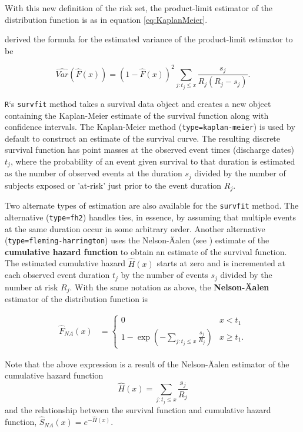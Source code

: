 \documentclass[]{book}
\theoremstyle{definition}
\theoremstyle{definition}
\theoremstyle{definition}
\theoremstyle{remark}
\begin{document}
With this new definition of the risk set, the product-limit estimator of
the distribution function is as in equation \eqref{eq:KaplanMeier}.

\citep{greenwood1926} derived the formula for the estimated variance of
the product-limit estimator to be

\[\widehat{Var}(\hat{F}(x)) = (1-\hat{F}(x))^{2} \sum _{j:t_{j} \leq x} \dfrac{s_j}{R_{j}(R_{j}-s_j)}.\]

\texttt{R}`s \texttt{survfit} method takes a survival data object and
creates a new object containing the Kaplan-Meier estimate of the
survival function along with confidence intervals. The Kaplan-Meier
method (\texttt{type=\textquotesingle{}kaplan-meier\textquotesingle{}})
is used by default to construct an estimate of the survival curve. The
resulting discrete survival function has point masses at the observed
event times (discharge dates) \(t_j\), where the probability of an event
given survival to that duration is estimated as the number of observed
events at the duration \(s_j\) divided by the number of subjects exposed
or 'at-risk' just prior to the event duration \(R_j\).

Two alternate types of estimation are also available for the
\texttt{survfit} method. The alternative
(\texttt{type=\textquotesingle{}fh2\textquotesingle{}}) handles ties, in
essence, by assuming that multiple events at the same duration occur in
some arbitrary order. Another alternative
(\texttt{type=\textquotesingle{}fleming-harrington\textquotesingle{}})
uses the Nelson-Äalen (see \citep{aalen1978}) estimate of the
\textbf{cumulative hazard function} to obtain an estimate of the
survival function. The estimated cumulative hazard \(\hat{H}(x)\) starts
at zero and is incremented at each observed event duration \(t_j\) by
the number of events \(s_j\) divided by the number at risk \(R_j\). With
the same notation as above, the \textbf{Nelson-Äalen} estimator of the
distribution function is

\[\begin{aligned}
\hat{F}_{NA}(x) &=
\left\{
\begin{array}{ll}
0 & x<t_{1} \\
1- \exp \left(-\sum_{j:t_{j} \leq x}\frac{s_j}{R_j} \right) & x \geq t_{1} .
\end{array}
\right.\end{aligned}\]

Note that the above expression is a result of the Nelson-Äalen estimator
of the cumulative hazard function
\[\hat{H}(x)=\sum_{j:t_j\leq x}  \frac{s_j}{R_j} \] and the relationship
between the survival function and cumulative hazard function,
\(\hat{S}_{NA}(x)=e^{-\hat{H}(x)}\).
\end{document}
